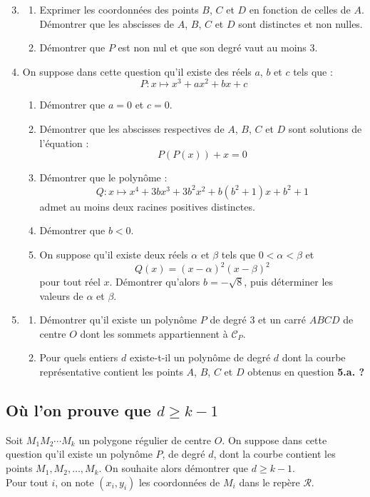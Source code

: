 \documentclass[landscape,twocolumn,leqno,a4paper,10pt]{report} %
\renewcommand{\geq}{\geqslant}
\renewcommand{\textbf}[1]{\begingroup\bfseries\mathversion{bold}#1\endgroup}		%
\begin{document}
\begin{enumerate}\setcounter{enumi}{2}
	\item \begin{enumerate}
		\item Exprimer les coordonnées des points $B$, $C$ et $D$ en fonction de celles de $A$. Démontrer que les abscisses de $A$, $B$, $C$ et $D$ sont distinctes et non nulles.
		\item Démontrer que $P$ est non nul et que son degré vaut au moins 3.
	\end{enumerate}
	\item On suppose dans cette question qu'il existe des réels $a$, $b$ et $c$ tels que :
	$$P: x \mapsto x^{3}+a x^{2}+b x+c$$
	\begin{enumerate}
		\item Démontrer que $a=0$ et $c=0$.
		\item Démontrer que les abscisses respectives de $A$, $B$, $C$ et $D$ sont solutions de l'équation :
		$$P(P(x))+x=0$$
		\item Démontrer que le polynôme :
		$$Q: x \mapsto x^{4}+3 b x^{3}+3 b^{2} x^{2}+b\left(b^{2}+1\right) x+b^{2}+1$$
		admet au moins deux racines positives distinctes.
		\item Démontrer que $b<0$.
		\item On suppose qu'il existe deux réels $\alpha$ et $\beta$ tels que $0<\alpha<\beta$ et
		$$Q(x)=(x-\alpha)^{2}(x-\beta)^{2}$$
		pour tout réel $x$. Démontrer qu'alors $b=-\sqrt{8}$, puis déterminer les valeurs de $\alpha$ et $\beta$.
	\end{enumerate}
	\item \begin{enumerate}
		\item Démontrer qu'il existe un polynôme $P$ de degré 3 et un carré $ABCD$ de centre $O$ dont les sommets appartiennent à $\mathscr{C}_{P}$.
		\item Pour quels entiers $d$ existe-t-il un polynôme de degré $d$ dont la courbe représentative contient les points $A$, $B$, $C$ et $D$ obtenus en question \textbf{5.a.} ?
	\end{enumerate}
\end{enumerate}


\subsection{Où l'on prouve que $d \geq k-1$}

Soit $M_{1} M_{2} \cdots M_{k}$ un polygone régulier de centre $O$. On suppose dans cette question qu'il existe un polynôme $P$, de degré $d$, dont la courbe contient les points $M_{1}, M_{2}, \ldots, M_{k}$. On souhaite alors démontrer que $d \geq k-1$.\\
Pour tout $i$, on note $\left(x_{i}, y_{i}\right)$ les coordonnées de $M_{i}$ dans le repère $\mathscr{R}$.
\end{document}
